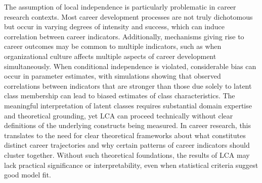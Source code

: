 \documentclass[main.tex]{subfiles}
\begin{document}
The assumption of local independence is particularly problematic in career research contexts. Most career development processes are not truly dichotomous but occur in varying degrees of intensity and success, which can induce correlation between career indicators\parencite{pepe2007}. Additionally, mechanisms giving rise to career outcomes may be common to multiple indicators, such as when organizational culture affects multiple aspects of career development simultaneously. When conditional independence is violated, considerable bias can occur in parameter estimates, with simulations showing that observed correlations between indicators that are stronger than those due solely to latent class membership can lead to biased estimates of class characteristics\parencite{pepe2007}.
The meaningful interpretation of latent classes requires substantial domain expertise and theoretical grounding, yet LCA can proceed technically without clear definitions of the underlying constructs being measured\parencite{pepe2007}. In career research, this translates to the need for clear theoretical frameworks about what constitutes distinct career trajectories and why certain patterns of career indicators should cluster together. Without such theoretical foundations, the results of LCA may lack practical significance or interpretability, even when statistical criteria suggest good model fit.
\end{document}
